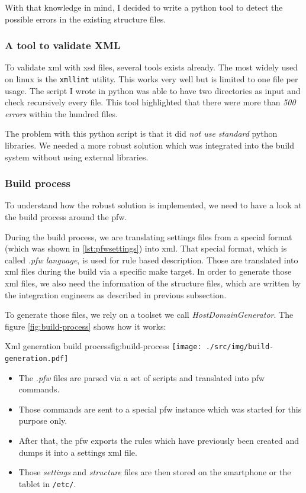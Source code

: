 With that knowledge in mind, I decided to write a \gls{python} tool to detect the possible errors in the existing structure files.

\subsubsection{A tool to validate XML}
To validate \gls{xml} with \gls{xsd} files, several tools exists already. The most widely used on linux is the \lstinline{xmllint} utility.
This works very well but is limited to one file per usage. The script I wrote in \gls{python} was able to have two directories as input and check
recursively every file.
This tool highlighted that there were more than \emph{500 errors} within the hundred files.

The problem with this \gls{python} script is that it did \emph{not use standard} \gls{python} libraries.
We needed a more robust solution which was integrated into the build system without using external libraries.

\subsubsection{Build process}
To understand how the robust solution is implemented, we need to have a look at the build process around the \gls{pfw}.

During the build process, we are translating settings files from a special format (which was shown in \ref{lst:pfwsettings}) into \gls{xml}.
That special format, which is called \emph{.pfw language}, is used for rule based
description. Those are translated into \gls{xml} files during the build via a
specific make target.  In order to generate those \gls{xml} files, we also need
the information of the structure files, which are written by the integration
engineers as described in previous subsection.

To generate those files, we rely on a toolset we call \emph{HostDomainGenerator}.
The figure \ref{fig:build-process} shows how it works:

\begin{figureGraphics}{Xml generation build process}{fig:build-process}
    \texttt{[image: ./src/img/build-generation.pdf]}
\end{figureGraphics}

\begin{itemize}
    \item The \emph{.pfw} files are parsed via a set of scripts and translated into \gls{pfw} commands.
    \item Those commands are sent to a special \gls{pfw} instance which was started for this purpose only.
    \item After that, the \gls{pfw} exports the rules which have previously been created and dumps it into a settings \gls{xml} file.
    \item Those \emph{settings} and \emph{structure} files are then stored on the smartphone or the tablet in \lstinline{/etc/}.
\end{itemize}

